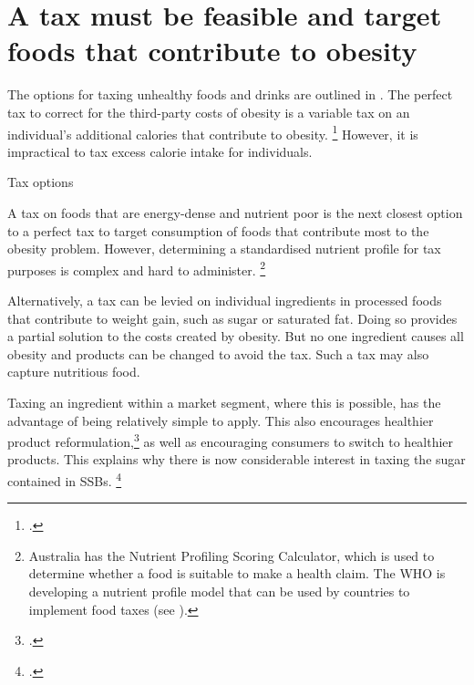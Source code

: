 \documentclass[embargoed]{grattan}
\begin{document}
\section{A tax must be feasible and target foods that contribute to obesity }\label{a-tax-must-be-feasible-and-target-foods-that-contribute-to-obesity}

The options for taxing unhealthy foods and drinks are outlined in .
The perfect tax to correct for the third-party costs of obesity is a variable tax on an individual's additional calories that contribute to obesity.%
\footcite{Freebairn2010Taxationobesity} However, it is impractical to tax excess calorie intake for individuals.

\begin{table}
\caption{Tax options}\label{tbl:Tax-options}



\end{table}

A tax on foods that are energy-dense and nutrient poor is the next closest option to a perfect tax to target consumption of foods that contribute most to the obesity problem.
However, determining a standardised nutrient profile for tax purposes is complex and hard to administer.%
\footnote{Australia has the Nutrient Profiling Scoring Calculator, which is used to determine whether a food is suitable to make a health claim.
The WHO is developing a nutrient profile model that can be used by countries to implement food taxes (see \textcite{Organization2016FiscalPoliciesDiet}).}

Alternatively, a tax can be levied on individual ingredients in processed foods that contribute to weight gain, such as sugar or saturated fat.
Doing so provides a partial solution to the costs created by obesity.
But no one ingredient causes all obesity and products can be changed to avoid the tax. Such a tax may also capture nutritious food.

Taxing an ingredient within a market segment, where this is possible, has the advantage of being relatively simple to apply.
This also encourages healthier product reformulation,\footcite{Team2016Sugarlevyworking} as well as encouraging consumers to switch to healthier products.
This explains why there is now considerable interest in taxing the sugar contained in SSBs.%
\footcites{Smith2016SoftDrinksLevy}{SouthAfricaNationalTreasury2016TaxationSugarSweetened}
\end{document}
